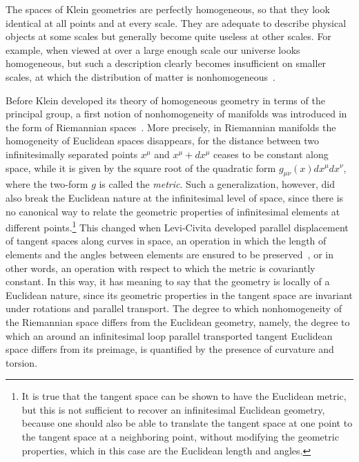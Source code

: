 \documentclass[
final,
11pt,
a4paper,
DIV=11,
headinclude=true,
footinclude=false,
bibliography=totoc,
twoside=true,  %
BCOR=5mm
]{scrbook}
\begin{document}
The spaces of Klein geometries are perfectly homogeneous, so that 
they look identical at all points and at every scale. They are 
adequate to describe physical objects at some scales but 
generally become quite useless at other scales. For example, when 
viewed at over a large enough scale our universe looks 
homogeneous, but such a description clearly becomes insufficient 
on smaller scales, at which the distribution of matter is 
nonhomogeneous~\cite{Wu:1998ad}.

Before Klein developed its theory of homogeneous geometry in 
terms of the principal group, a first notion of nonhomogeneity of 
manifolds was introduced in the form of Riemannian 
spaces~\cite{riemann:1854}. More precisely, in Riemannian 
manifolds the homogeneity of Euclidean spaces disappears, for the 
distance between two infinitesimally separated points $x^\mu$ and 
$x^\mu + dx^\mu$ ceases to be constant along space, while it is 
given by the square root of the quadratic form 
$g_{\mu\nu}(x)dx^\mu dx^\nu$, where the two-form $g$ is called 
the \emph{metric}. Such a generalization, however, did also break 
the Euclidean nature at the infinitesimal level of space, since 
there is no canonical way to relate the geometric properties of 
infinitesimal elements at different points.\footnote{It is true 
  that the tangent space can be shown to have the Euclidean 
  metric, but this is not sufficient to recover an infinitesimal 
  Euclidean geometry, because one should also be able to 
  translate the tangent space at one point to the tangent space 
  at a neighboring point, without modifying the geometric 
  properties, which in this case are the Euclidean length and 
  angles.} This changed when Levi-Civita developed parallel 
displacement of tangent spaces along curves in space, an 
operation in which the length of elements and the angles between 
elements are ensured to be preserved~\cite{levicivita:1916}, or 
in other words, an operation with respect to which the metric is 
covariantly constant. In this way, it has meaning to say that the 
geometry is locally of a Euclidean nature, since its geometric 
properties in the tangent space are invariant under rotations and 
parallel transport. The degree to which nonhomogeneity of the 
Riemannian space differs from the Euclidean geometry, namely, the 
degree to which an around an infinitesimal loop parallel 
transported tangent Euclidean space differs from its preimage, is 
quantified by the presence of curvature and torsion. 
\end{document}
